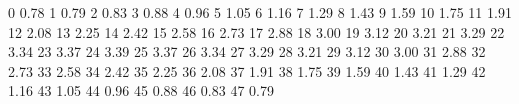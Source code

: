 0 0.78
1 0.79
2 0.83
3 0.88
4 0.96
5 1.05
6 1.16
7 1.29
8 1.43
9 1.59
10 1.75
11 1.91
12 2.08
13 2.25
14 2.42
15 2.58
16 2.73
17 2.88
18 3.00
19 3.12
20 3.21
21 3.29
22 3.34
23 3.37
24 3.39
25 3.37
26 3.34
27 3.29
28 3.21
29 3.12
30 3.00
31 2.88
32 2.73
33 2.58
34 2.42
35 2.25
36 2.08
37 1.91
38 1.75
39 1.59
40 1.43
41 1.29
42 1.16
43 1.05
44 0.96
45 0.88
46 0.83
47 0.79
